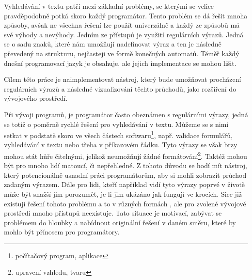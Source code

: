 Vyhledávání v textu patří mezi základní problémy, se kterými se velice pravděpodobně potká skoro každý programátor. 
Tento problém se dá řešit mnoha způsoby, avšak ne všechna řešení lze použít univerzálně a každý ze způsobů má své výhody a nevýhody.
Jedním ze přístupů je využití regulárních výrazů. Jedná se o sadu znaků, které nám umožňují nadefinovat výraz a ten je následně převedený na strukturu, nejčasteji ve formě konečných automatů.
Téměř každý dnešní programovací jazyk je obsahuje, ale jejich implementace se mohou lišit.

Cílem této práce je naimplementovat nástroj, který bude umožňovat procházení regulárních výrazů a následné vizualizování těchto průchodů, jako rozšíření do vývojového prostředí.

Při vývoji programů, je programátor často obeznámen s regulárními výrazy, jedná se totiž o poměrně rychlé řešení pro vyhledávání v textu. 
Můžeme se s nimi setkat v podstatě skoro ve všech částech softwaru\footnote[1]{počítačový program, aplikace}, např. validace formulářů, vyhledávání v textu nebo třeba v příkazovém řádku.
Tyto výrazy se však brzy mohou stát hůře čitelnými, jelikož neumožňují žádné formátování\footnote[2]{upravení vzhledu, tvaru}. 
Taktéž mohou být pro mnoho lidí matoucí, či nepřehledné.
Z tohoto důvodu se hodí mít nástroj, který potencionálně usnadní práci programátorům, aby si mohli zobrazit průchod zadaným výrazem.
Dále pro lidi, kteří například vidí tyto výrazy poprvé v životě může být snažší jim porozumět, je-li jim ukázáno jak fungují ve krocích.
Sice již existují řešení tohoto problému a to v různých formách \cite{Dib, Regexper, RegExr}, ale pro zvolené vývojové prostředí mnoho přístupů neexistuje.
Tato situace je motivací, zabývat se problémem do hloubky a nabídnout originální řešení v daném směru, které by mohlo být přínosem pro programátory.




\endinput